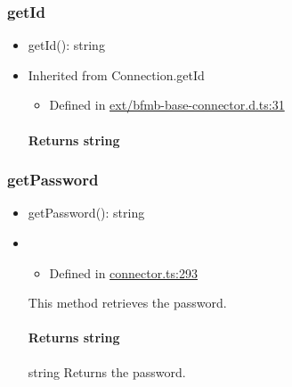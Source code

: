 \documentclass[]{article}
\providecommand{\tightlist}{%
  \setlength{\itemsep}{0pt}\setlength{\parskip}{0pt}}
\let\oldparagraph\paragraph
\renewcommand{\paragraph}[1]{\oldparagraph{#1}\mbox{}}
\begin{document}
\protect\hypertarget{getid}{}{}

\hypertarget{getid}{%
\subsubsection{getId}\label{getid}}

\begin{itemize}
\tightlist
\item
  getId{(}{)}{: }{string}
\end{itemize}

\begin{itemize}
\item
  Inherited from Connection.getId

  \begin{itemize}
  \tightlist
  \item
    Defined in
    \href{https://github.com/BFMBFramework/TadoConnector/blob/f05932b/src/ext/bfmb-base-connector.d.ts\#L31}{ext/bfmb-base-connector.d.ts:31}
  \end{itemize}

  \hypertarget{returns-string}{%
  \paragraph{\texorpdfstring{Returns
  {string}}{Returns string}}\label{returns-string}}
\end{itemize}

\protect\hypertarget{getpassword}{}{}

\hypertarget{getpassword}{%
\subsubsection{getPassword}\label{getpassword}}

\begin{itemize}
\tightlist
\item
  getPassword{(}{)}{: }{string}
\end{itemize}

\begin{itemize}
\item
  \begin{itemize}
  \tightlist
  \item
    Defined in
    \href{https://github.com/BFMBFramework/TadoConnector/blob/f05932b/src/connector.ts\#L293}{connector.ts:293}
  \end{itemize}

  This method retrieves the password.

  \hypertarget{returns-string-1}{%
  \paragraph{\texorpdfstring{Returns
  {string}}{Returns string}}\label{returns-string-1}}

  string Returns the password.
\end{itemize}
\end{document}
